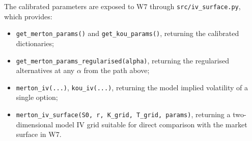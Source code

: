 The calibrated parameters are exposed to W7 through
\texttt{src/iv\_surface.py}, which provides:
\begin{itemize}[leftmargin=*]
   \item \texttt{get\_merton\_params()} and \texttt{get\_kou\_params()},
         returning the calibrated dictionaries;
   \item \texttt{get\_merton\_params\_regularised(alpha)}, returning the
         regularised alternatives at any $\alpha$ from the path above;
   \item \texttt{merton\_iv(...)}, \texttt{kou\_iv(...)}, returning the
         model implied volatility of a single option;
   \item \texttt{merton\_iv\_surface(S0, r, K\_grid, T\_grid, params)},
         returning a two-dimensional model IV grid suitable for direct
         comparison with the market surface in W7.
\end{itemize}
